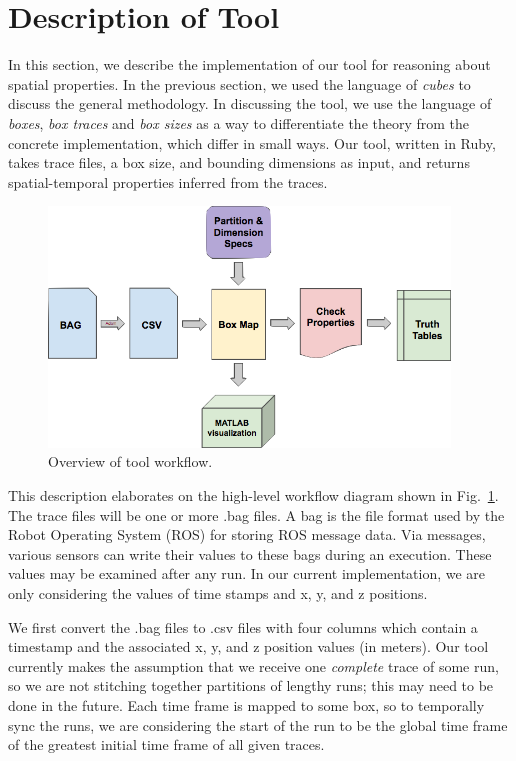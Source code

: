 \section{Description of Tool}
\label{sec:tool}

In this section, we describe the implementation of our tool for reasoning about spatial properties.
In the previous section, we used the language of \emph{cubes} to discuss the general methodology. 
In discussing the tool, we use the language of \emph{boxes}, \emph{box traces} and \emph{box sizes} as a way to differentiate the theory from the concrete implementation, which differ in small ways.
Our tool, written in Ruby, takes trace files, a box size, and bounding dimensions as input, and returns spatial-temporal properties inferred from the traces.  

\begin{figure}[ht]
  \centering
  \includegraphics[width=0.95\textwidth]{./figures/workflow}
  \caption{Overview of tool workflow.}
  \label{fig:workflow}
\end{figure}

This description elaborates on the high-level workflow diagram shown in Fig.~\ref{fig:workflow}.
The trace files will be one or more .bag files.  
A bag is the file format used by the Robot Operating System (ROS) for storing ROS message data.  
Via messages, various sensors can write their values to these bags during an execution. 
These values may be examined after any run.
In our current implementation, we are only considering the values of time stamps and x, y, and z positions.

We first convert the .bag files to .csv files with four columns which contain a timestamp and the associated x, y, and z position values (in meters).  
 Our tool currently makes the assumption that we receive one \emph{complete} trace of some run, so we are not stitching together partitions of lengthy runs; this may need to be done in the future.
 Each time frame is mapped to some box, so to temporally sync the runs, we are considering the start of the run to be the global time frame of the greatest initial time frame of all given traces.

